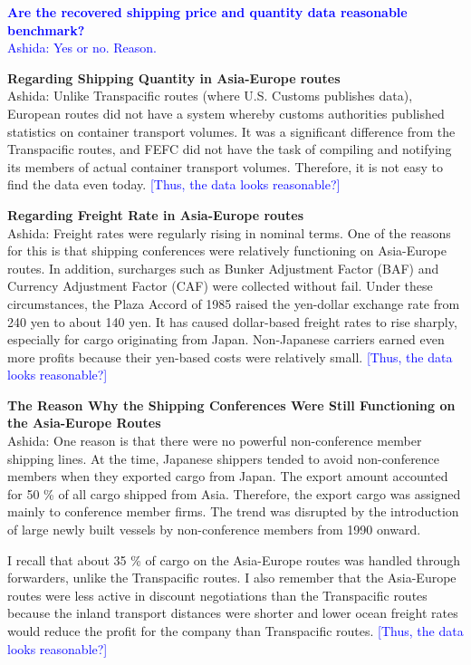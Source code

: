 \documentclass[11pt]{article}
\begin{document}
\textcolor{blue}{\textbf{Are the recovered shipping price and quantity data reasonable benchmark?} \\
Ashida: Yes or no. Reason.
}

\textbf{Regarding Shipping Quantity in Asia-Europe routes} \\
Ashida: Unlike Transpacific routes (where U.S. Customs publishes data), European routes did not have a system whereby customs authorities published statistics on container transport volumes. It was a significant difference from the Transpacific routes, and FEFC did not have the task of compiling and notifying its members of actual container transport volumes. Therefore, it is not easy to find the data even today. \textcolor{blue}{[Thus, the data looks reasonable?]}

\textbf{Regarding Freight Rate in Asia-Europe routes} \\
Ashida: Freight rates were regularly rising in nominal terms. One of the reasons for this is that shipping conferences were relatively functioning on Asia-Europe routes. In addition, surcharges such as Bunker Adjustment Factor (BAF) and Currency Adjustment Factor (CAF) were collected without fail. Under these circumstances, the Plaza Accord of 1985 raised the yen-dollar exchange rate from 240 yen to about 140 yen. It has caused dollar-based freight rates to rise sharply, especially for cargo originating from Japan. Non-Japanese carriers earned even more profits because their yen-based costs were relatively small.  \textcolor{blue}{[Thus, the data looks reasonable?]}

\textbf{The Reason Why the Shipping Conferences Were Still Functioning on the Asia-Europe Routes}\\
Ashida: One reason is that there were no powerful non-conference member shipping lines. At the time, Japanese shippers tended to avoid non-conference members when they exported cargo from Japan. The export amount accounted for 50 \% of all cargo shipped from Asia. Therefore, the export cargo was assigned mainly to conference member firms. The trend was disrupted by the introduction of large newly built vessels by non-conference members from 1990 onward.

I recall that about 35 \% of cargo on the Asia-Europe routes was handled through forwarders, unlike the Transpacific routes. I also remember that the Asia-Europe routes were less active in discount negotiations than the Transpacific routes because the inland transport distances were shorter and lower ocean freight rates would reduce the profit for the company than Transpacific routes. \textcolor{blue}{[Thus, the data looks reasonable?]}
\end{document}
